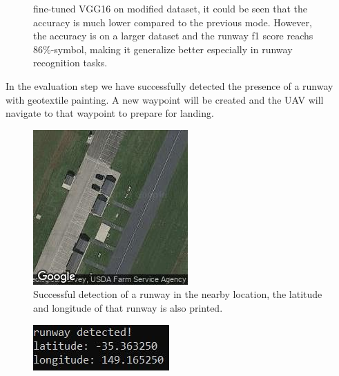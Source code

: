 \documentclass[10pt,twocolumn,letterpaper]{article}
\begin{document}
\begin{figure}[t]
\begin{center}
\end{center}
   \caption{fine-tuned VGG16 on modified dataset, it could be seen that the accuracy is much lower compared to the previous mode. However, the accuracy is on a larger dataset and the runway f1 score reachs 86\%-symbol, making it generalize better especially in runway recognition tasks.}
\label{fig:long}
\label{fig:onecol}
\end{figure}

In the evaluation step we have successfully detected the presence of a runway with geotextile painting. A new waypoint will be created and the UAV will navigate to that waypoint to prepare for landing.
\begin{figure}[t]
\begin{center}
   \includegraphics[width=0.5\linewidth]{runway.jpg}
\end{center}
   \caption{Successful detection of a runway in the nearby location, the latitude and longitude of that runway is also printed.}
\label{fig:long}
\label{fig:onecol}
\end{figure}
\begin{figure}[t]
\begin{center}
   \includegraphics[width=0.5\linewidth]{detection.jpg}
\end{center}
\label{fig:long}
\label{fig:onecol}
\end{figure}
\end{document}

